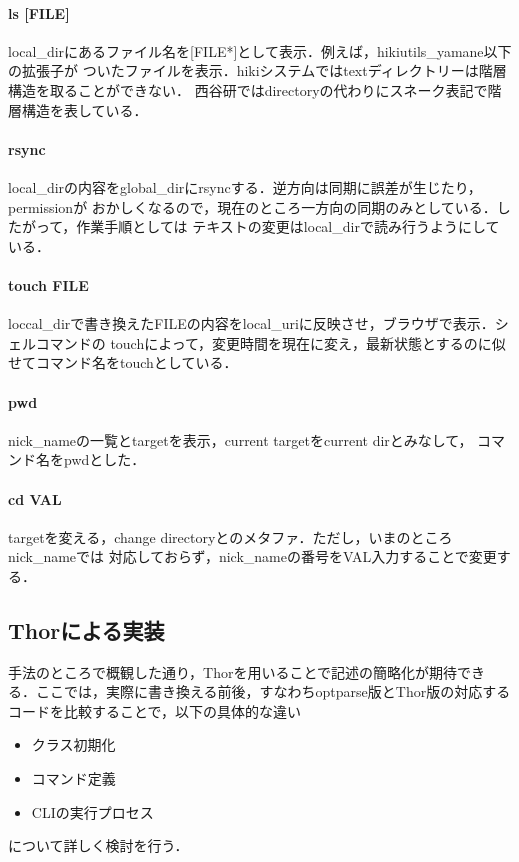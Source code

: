 \paragraph{ls [FILE]}
local\_dirにあるファイル名を[FILE*]として表示．例えば，hikiutils\_yamane以下の拡張子が
ついたファイルを表示．hikiシステムではtextディレクトリーは階層構造を取ることができない．
西谷研ではdirectoryの代わりにスネーク表記で階層構造を表している．

\paragraph{rsync}
local\_dirの内容をglobal\_dirにrsyncする．逆方向は同期に誤差が生じたり，permissionが
おかしくなるので，現在のところ一方向の同期のみとしている．したがって，作業手順としては
テキストの変更はlocal\_dirで読み行うようにしている．

\paragraph{touch FILE}
loccal\_dirで書き換えたFILEの内容をlocal\_uriに反映させ，ブラウザで表示．シェルコマンドの
touchによって，変更時間を現在に変え，最新状態とするのに似せてコマンド名をtouchとしている．

\paragraph{pwd}
nick\_nameの一覧とtargetを表示，current targetをcurrent dirとみなして，
コマンド名をpwdとした．

\paragraph{cd VAL}
targetを変える，change directoryとのメタファ．ただし，いまのところnick\_nameでは
対応しておらず，nick\_nameの番号をVAL入力することで変更する．

\subsection{Thorによる実装}
手法のところで概観した通り，Thorを用いることで記述の簡略化が期待できる．ここでは，実際に書き換える前後，すなわちoptparse版とThor版の対応するコードを比較することで，以下の具体的な違い

\begin{itemize}
\item クラス初期化
\item コマンド定義
\item CLIの実行プロセス
\end{itemize}
について詳しく検討を行う．

